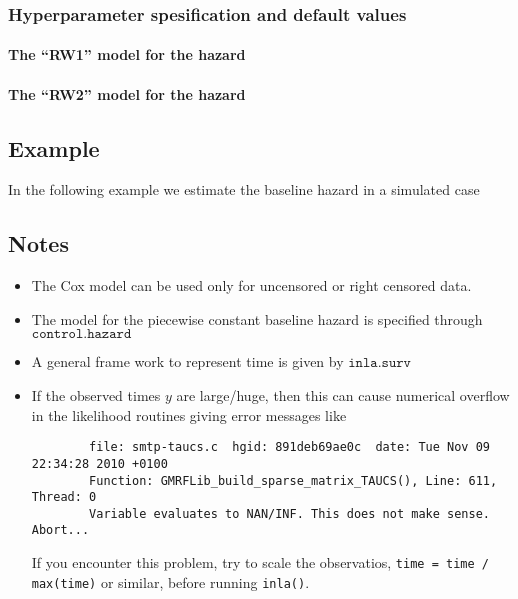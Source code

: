 \documentclass[a4paper,11pt]{article}
\begin{document}
\subsubsection*{Hyperparameter spesification and default values}
\paragraph{The ``RW1'' model for the hazard}

\paragraph{The ``RW2'' model for the hazard}



\subsection*{Example}

In the following example we estimate the baseline hazard in a
simulated case 

\subsection*{Notes}

\begin{itemize}
\item The Cox model can be used only for uncensored or right censored
    data.
\item The model for the piecewise constant baseline hazard is
    specified through $\texttt{control.hazard}$
\item A general frame work to represent time is given by
    $\texttt{inla.surv}$
\item If the observed times $y$ are large/huge, then this can cause
    numerical overflow in the likelihood routines giving error
    messages like
\begin{verbatim}
        file: smtp-taucs.c  hgid: 891deb69ae0c  date: Tue Nov 09 22:34:28 2010 +0100
        Function: GMRFLib_build_sparse_matrix_TAUCS(), Line: 611, Thread: 0
        Variable evaluates to NAN/INF. This does not make sense. Abort...
\end{verbatim}
    If you encounter this problem, try to scale the observatios,
    \verb|time = time / max(time)| or similar, before running
    \verb|inla()|.
\end{itemize}
\end{document}
